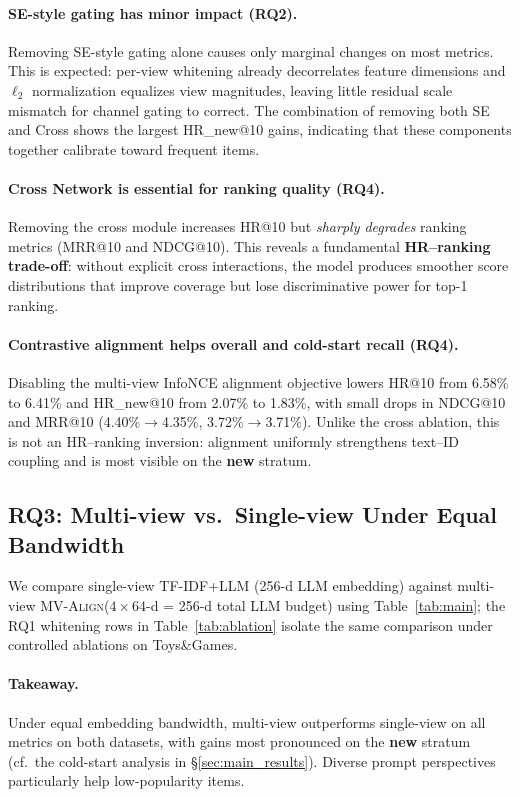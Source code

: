 \documentclass[sigconf,natbib=true,anonymous]{acmart}
\newcommand{\model}{\textsc{MV-Align}\xspace}
\begin{document}
\paragraph{SE-style gating has minor impact (RQ2).}
Removing SE-style gating alone causes only marginal changes on
most metrics. This is expected: per-view whitening already
decorrelates feature dimensions and $\ell_2$ normalization
equalizes view magnitudes, leaving little residual scale
mismatch for channel gating to correct.
The combination of removing both SE and Cross shows the largest
HR\_new@10 gains, indicating that these components together
calibrate toward frequent items.

\paragraph{Cross Network is essential for ranking quality (RQ4).}
Removing the cross module increases HR@10 but \emph{sharply degrades}
ranking metrics (MRR@10 and NDCG@10).
This reveals a fundamental \textbf{HR--ranking trade-off}: without
explicit cross interactions, the model produces smoother score
distributions that improve coverage but lose discriminative power
for top-1 ranking.

\paragraph{Contrastive alignment helps overall and cold-start recall (RQ4).}
Disabling the multi-view InfoNCE alignment objective lowers HR@10
from 6.58\% to 6.41\% and HR\_new@10 from 2.07\% to 1.83\%, with
small drops in NDCG@10 and MRR@10 (4.40\%$\rightarrow$4.35\%,
3.72\%$\rightarrow$3.71\%).
Unlike the cross ablation, this is not an HR--ranking inversion:
alignment uniformly strengthens text--ID coupling and is most
visible on the \textbf{new} stratum.

\subsection{RQ3: Multi-view vs.\ Single-view Under Equal Bandwidth}

We compare single-view TF-IDF+LLM (256-d LLM embedding) against
multi-view \model ($4\times 64$-d = 256-d total LLM budget) using
Table~\ref{tab:main}; the RQ1 whitening rows in Table~\ref{tab:ablation}
isolate the same comparison under controlled ablations on Toys\&Games.

\paragraph{Takeaway.}
Under equal embedding bandwidth, multi-view outperforms
single-view on all metrics on both datasets, with gains most
pronounced on the \textbf{new} stratum (cf.\ the cold-start
analysis in \S\ref{sec:main_results}). Diverse prompt perspectives
particularly help low-popularity items.
\end{document}

